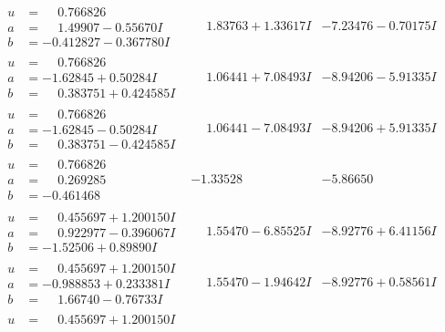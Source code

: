\documentclass[1p]{elsarticle_modified}
\theoremstyle{definition}
\begin{document}
$$\begin{array}{c|c|c}
 \hline 
\begin{aligned}
u &= \phantom{-}0.766826\phantom{ +0.000000I} \\
a &= \phantom{-}1.49907 - 0.55670 I \\
b &= -0.412827 - 0.367780 I\end{aligned}
 & \phantom{-}1.83763 + 1.33617 I & -7.23476 - 0.70175 I \\ \hline\begin{aligned}
u &= \phantom{-}0.766826\phantom{ +0.000000I} \\
a &= -1.62845 + 0.50284 I \\
b &= \phantom{-}0.383751 + 0.424585 I\end{aligned}
 & \phantom{-}1.06441 + 7.08493 I & -8.94206 - 5.91335 I \\ \hline\begin{aligned}
u &= \phantom{-}0.766826\phantom{ +0.000000I} \\
a &= -1.62845 - 0.50284 I \\
b &= \phantom{-}0.383751 - 0.424585 I\end{aligned}
 & \phantom{-}1.06441 - 7.08493 I & -8.94206 + 5.91335 I \\ \hline\begin{aligned}
u &= \phantom{-}0.766826\phantom{ +0.000000I} \\
a &= \phantom{-}0.269285\phantom{ +0.000000I} \\
b &= -0.461468\phantom{ +0.000000I}\end{aligned}
 & -1.33528\phantom{ +0.000000I} & -5.86650\phantom{ +0.000000I} \\ \hline\begin{aligned}
u &= \phantom{-}0.455697 + 1.200150 I \\
a &= \phantom{-}0.922977 - 0.396067 I \\
b &= -1.52506 + 0.89890 I\end{aligned}
 & \phantom{-}1.55470 - 6.85525 I & -8.92776 + 6.41156 I \\ \hline\begin{aligned}
u &= \phantom{-}0.455697 + 1.200150 I \\
a &= -0.988853 + 0.233381 I \\
b &= \phantom{-}1.66740 - 0.76733 I\end{aligned}
 & \phantom{-}1.55470 - 1.94642 I & -8.92776 + 0.58561 I \\ \hline\begin{aligned}
u &= \phantom{-}0.455697 + 1.200150 I \\

\end{aligned}
\end{array}$$
\end{document}
